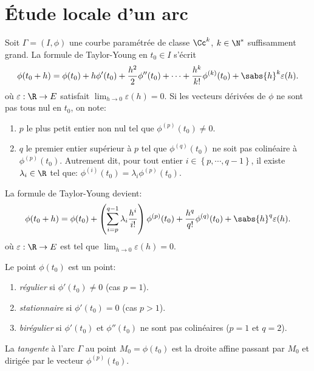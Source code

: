 \sld{\vfill\pagebreak[5]}%
\section{\'Etude locale d'un arc}

Soit $\Gamma=(I,\phi)$ une courbe paramétrée de classe $\Cc^k$, $k\in\N^*$ suffisamment grand. La formule de Taylor-Young en $t_0\in I$ s'écrit 
\[
	\phi(t_0 + h) =  \phi(t_0) + h \phi'(t_0) + \frac{h^2}{2} \phi''(t_0) + \cdots + \frac{h^k}{k!} \phi^{(k)}(t_0) + \sabs{h}^k \varepsilon(h). 
\]
où $\varepsilon: \R \to E$ satisfait $\lim_{h\to 0} \varepsilon(h) =0$. Si les vecteurs dérivées de $\phi$ ne sont pas tous nul en $t_0$, on note:  %

\begin{enumerate}
	\item $p$ le plus petit entier non nul tel que $\phi^{(p)}(t_0)\neq 0 $.
	\item  $q$ le premier entier supérieur à $p$ tel que $\phi^{(q)}(t_0)$ ne soit pas colinéaire à $\phi^{(p)}(t_0) $. Autrement dit, pour tout entier $i\in\left\{ p,\cdots,q-1\right\}$, il existe $\lambda_i\in\R$ tel que: $\phi^{(i)}(t_0) = \lambda_i \phi^{(p)} (t_0)$. 
\end{enumerate}\sld{\vfill\pagebreak[5]}%
La formule de Taylor-Young devient:
\[
	\phi(t_0 + h) =  \phi(t_0) + \left( \sum_{i=p}^{q-1} \lambda_i \frac{h^i}{i!} \right) \phi^{(p)}(t_0) + \frac{h^q}{q!} \phi^{(q)}(t_0)+ \sabs{h}^q \varepsilon(h).
\]
où $\varepsilon: \R \to E$ est tel que $\lim_{h\to 0} \varepsilon(h) =0$.

\begin{definition}
	Le point $\phi(t_0)$ est un point:
	\begin{enumerate}
		\item \emph{régulier} si $\phi'(t_0) \neq 0$ (cas $p=1$). 
		\item \emph{stationnaire} si $\phi'(t_0) =0$ (cas $p>1$). 
	\item \emph{birégulier} si $\phi'(t_0)$ et $ \phi''(t_0)$ ne sont pas colinéaires  ($p=1$ et  $q=2 $).
	\end{enumerate}
\end{definition}

\begin{definition}
	La \emph{tangente} à l'arc $\Gamma$ au point $M_0 = \phi(t_0)$ est la droite affine passant par $M_0$ et dirigée par le vecteur $\phi^{(p)}(t_0)$.
\end{definition}
 \pl{\rep{3cm}}

